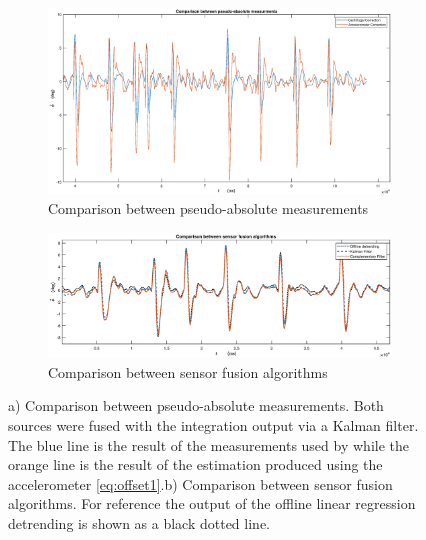 \begin{figure}
    \centering
    \begin{subfigure}[b]{\textwidth}
        \centering
        \includegraphics[width=1\linewidth]{images/figureB_1.eps}
        \caption{Comparison between pseudo-absolute measurements}
        \label{fig:results_app1}
    \end{subfigure}
    \begin{subfigure}[b]{\textwidth}
        \centering
        \includegraphics[width=1\linewidth]{images/figureB_2.eps}
        \caption{Comparison between sensor fusion algorithms}
        \label{fig:results_app2}
    \end{subfigure}
    \caption{a) Comparison between pseudo-absolute measurements. Both sources were fused with the integration output via a Kalman filter. The blue line is the result of the measurements used by \citet{sanjurjo2018roll} while the orange line is the result of the estimation produced using the accelerometer  \cref{eq:offset1}.b) Comparison between sensor fusion algorithms. For reference the output of the offline linear regression detrending is shown as a black dotted line.}
    \label{fig:results_app}
 \end{figure}
 
